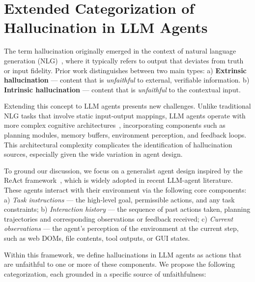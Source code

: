 \section{Extended Categorization of  Hallucination in LLM Agents}
\label{section_3}

The term hallucination originally emerged in the context of natural language generation (NLG)~\cite{bang2025hallulens, huang2025survey, ji2023survey}, where it typically refers to output that deviates from truth or input fidelity. Prior work distinguishes between two main types: a) \textbf{Extrinsic hallucination} --- content that is \textit{unfaithful} to external, verifiable information. b) \textbf{Intrinsic hallucination} --- content that is \textit{unfaithful} to the contextual input.

Extending this concept to LLM agents presents new challenges. Unlike traditional NLG tasks that involve static input-output mappings, LLM agents operate with more complex cognitive architectures~\cite{sumers2023cognitive}, incorporating components such as planning modules, memory buffers, environment perception, and feedback loops. This architectural complexity complicates the identification of hallucination sources, especially given the wide variation in agent design.

To ground our discussion, we focus on a generalist agent design inspired by the ReAct framework~\cite{yao2023reactsynergizingreasoningacting}, which is widely adopted in recent LLM-agent literature. These agents interact with their environment via the following core components: a) \textit{Task instructions} — the high-level goal, permissible actions, and any task constraints; b) \textit{Interaction history} — the sequence of past actions taken, planning trajectories and corresponding observations or feedback received; c) \textit{Current observations} — the agent's perception of the environment at the current step, such as web DOMs, file contents, tool outputs, or GUI states.

Within this framework, we define hallucinations in LLM agents as actions that are unfaithful to one or more of these components. We propose the following categorization, each grounded in a specific source of unfaithfulness:


